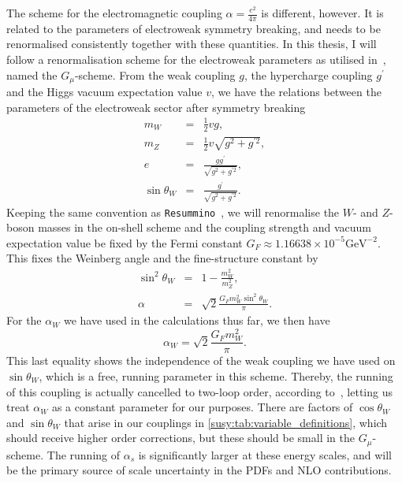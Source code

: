 \documentclass[../main.tex]{subfiles}
\begin{document}
The scheme for the electromagnetic coupling \(\alpha = \frac{e^2}{4\pi}\) is different, however.
It is related to the parameters of electroweak symmetry breaking, and needs to be renormalised consistently together with these quantities.
In this thesis, I will follow a renormalisation scheme for the electroweak parameters as utilised in~\cite{Denner:2019vbn}, named the \(G_\mu\)-scheme.
From the weak coupling \(g\), the hypercharge coupling \(g^\prime\) and the Higgs vacuum expectation value \(v\), we have the relations between the parameters of the electroweak sector after symmetry breaking
\begin{subequations}
  \begin{eqnarray}
    m_W &=& \frac{1}{2}v g, \\
    m_Z &=& \frac{1}{2} v \sqrt{g^2 + g^{\prime 2}}, \\
    e &=& \frac{g g^\prime}{\sqrt{g^2 + g^{\prime 2}}}, \\
    \sin\theta_W &=& \frac{g^\prime}{\sqrt{g^2 + g^{\prime 2}}}.
  \end{eqnarray}
\end{subequations}
Keeping the same convention as \verb|Resummino|~\cite{Resummino}, we will renormalise the \(W\)- and \(Z\)-boson masses in the on-shell scheme and the coupling strength and vacuum expectation value be fixed by the Fermi constant \(G_F \approx 1.16638 \times 10^{-5} \text{GeV}^{-2}\).
This fixes the Weinberg angle and the fine-structure constant by
\begin{subequations}
  \begin{eqnarray}
    \sin^2\theta_W &=& 1 - \frac{m_W^2}{m_Z^2}, \\
    \alpha &=& \sqrt{2} \frac{G_F m_W^2 \sin^2\theta_W}{\pi}.
  \end{eqnarray}
\end{subequations}
For the \(\alpha_W\) we have used in the calculations thus far, we then have
\begin{equation}
  \alpha_W = \sqrt{2} \frac{G_F m_W^2}{\pi}.
\end{equation}
This last equality shows the independence of the weak coupling we have used on \(\sin\theta_W\), which is a free, running parameter in this scheme.
Thereby, the running of this coupling is actually cancelled to two-loop order, according to~\cite{Denner:2019vbn}, letting us treat \(\alpha_W\) as a constant parameter for our purposes.
There are factors of \(\cos\theta_W\) and \(\sin\theta_W\) that arise in our couplings  in \cref{susy:tab:variable_definitions}, which should receive higher order corrections, but these should be small in the \(G_\mu\)-scheme.
The running of \(\alpha_s\) is significantly larger at these energy scales, and will be the primary source of scale uncertainty in the PDFs and NLO contributions.
\end{document}
